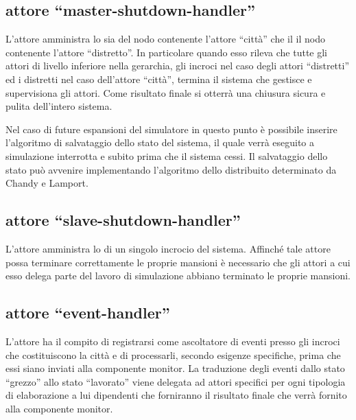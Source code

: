 \subsection*{attore ``master-shutdown-handler''}
\label{soluzione-proposta-architettura-master-shutdown-handler}
L'attore amministra lo  sia del nodo contenente l'attore ``città'' che il il nodo contenente l'attore ``distretto''. In particolare quando esso rileva che tutte gli attori di livello inferiore nella gerarchia, gli incroci nel caso degli attori ``distretti'' ed i distretti nel caso dell'attore ``città'', termina il sistema che gestisce e supervisiona gli attori. Come risultato finale si otterrà una chiusura sicura e pulita dell'intero sistema.

Nel caso di future espansioni del simulatore in questo punto è possibile inserire l'algoritmo di salvataggio dello stato del sistema, il quale verrà eseguito a simulazione interrotta e subito prima che il sistema cessi. Il salvataggio dello stato può avvenire implementando l'algoritmo dello  distribuito determinato da Chandy e Lamport.

\subsection*{attore ``slave-shutdown-handler''}
\label{soluzione-proposta-architettura-slave-shutdown-handler}
L'attore amministra lo  di un singolo incrocio del sistema. Affinché tale attore possa terminare correttamente le proprie mansioni è necessario che gli attori a cui esso delega parte del lavoro di simulazione abbiano terminato le proprie mansioni.

\subsection*{attore ``event-handler''}
\label{soluzione-proposta-architettura-event-handler}
L'attore ha il compito di registrarsi come ascoltatore di eventi presso gli incroci che costituiscono la città e di processarli, secondo esigenze specifiche, prima che essi siano inviati alla componente monitor. La traduzione degli eventi dallo stato ``grezzo'' allo stato ``lavorato'' viene delegata ad attori specifici per ogni tipologia di elaborazione a lui dipendenti che forniranno il risultato finale che verrà fornito alla componente monitor.

